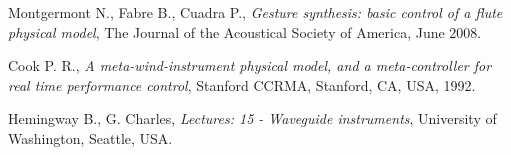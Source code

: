 \documentclass[nostrict]{szablonPG}
\begin{document}
\begin{thebibliography}{20}
		Montgermont N., Fabre B., Cuadra P., \emph{Gesture synthesis: basic control of a flute physical model}, The Journal of the Acoustical Society of America, June 2008.
		
		Cook P. R., \emph{A meta-wind-instrument physical model, and a meta-controller for real time performance control}, Stanford CCRMA, Stanford, CA, USA, 1992.
		
		Hemingway B., G. Charles, \emph{Lectures: 15 - Waveguide instruments}, University of Washington, Seattle, USA.
	\end{thebibliography}
	
\end{document}
